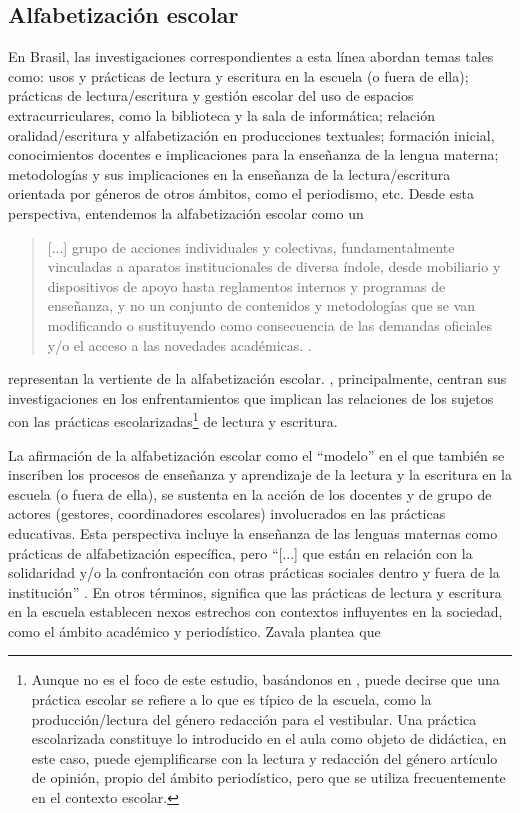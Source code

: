 \documentclass{textolivre}
\begin{document}
\subsection{Alfabetización escolar}\label{sec-escolar}
En Brasil, las investigaciones correspondientes a esta línea abordan temas tales como: usos y prácticas de lectura y escritura en la escuela (o fuera de ella); prácticas de lectura/escritura y gestión escolar del uso de espacios extracurriculares, como la biblioteca y la sala de informática; relación oralidad/escritura y alfabetización en producciones textuales; formación inicial, conocimientos docentes e implicaciones para la enseñanza de la lengua materna; metodologías y sus implicaciones en la enseñanza de la lectura/escritura orientada por géneros de otros ámbitos, como el periodismo, etc. Desde esta perspectiva, entendemos la alfabetización escolar como un

\begin{quote}
    [...] grupo de acciones individuales y colectivas, fundamentalmente vinculadas a aparatos institucionales de diversa índole, desde mobiliario y dispositivos de apoyo hasta reglamentos internos y programas de enseñanza, y no un conjunto de contenidos y metodologías que se van modificando o sustituyendo como consecuencia de las demandas oficiales y/o el acceso a las novedades académicas. \cite[p. 323]{signorini_letramento_2007}.
\end{quote}

\textcite{rojo_concepcoes_1995, rojo_letramento_2001, signorini_letramento_2007, bunzen_os_2010} representan la vertiente de la alfabetización escolar. \textcite{signorini_letramento_2007, rojo_letramento_2001}, principalmente, centran sus investigaciones en los enfrentamientos que implican las relaciones de los sujetos con las prácticas escolarizadas\footnote{Aunque no es el foco de este estudio, basándonos en \textcite{rojo_letramento_2001}, puede decirse que una práctica escolar se refiere a lo que es típico de la escuela, como la producción/lectura del género redacción para el vestibular. Una práctica escolarizada constituye lo introducido en el aula como objeto de didáctica, en este caso, puede ejemplificarse con la lectura y redacción del género artículo de opinión, propio del ámbito periodístico, pero que se utiliza frecuentemente en el contexto escolar.} de lectura y escritura.

La afirmación de la alfabetización escolar como el “modelo” en el que también se inscriben los procesos de enseñanza y aprendizaje de la lectura y la escritura en la escuela (o fuera de ella), se sustenta en la acción de los docentes y de grupo de actores (gestores, coordinadores escolares) involucrados en las prácticas educativas. Esta perspectiva incluye la enseñanza de las lenguas maternas como prácticas de alfabetización específica, pero “[...] que están en relación con la solidaridad y/o la confrontación con otras prácticas sociales dentro y fuera de la institución” \cite[p. 323]{signorini_letramento_2007}. En otros términos, significa que las prácticas de lectura y escritura en la escuela establecen nexos estrechos con contextos influyentes en la sociedad, como el ámbito académico y periodístico. Zavala plantea que
\end{document}
